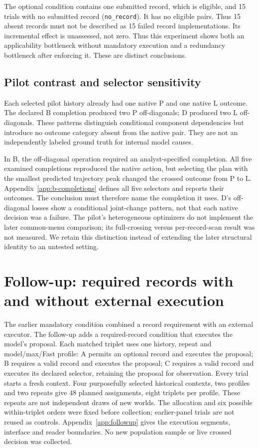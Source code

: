 The optional condition contains one submitted record, which is eligible,
and 15 trials with no submitted record (\texttt{no\_record}). It has no
eligible pairs. Thus 15 absent records must not be described as 15 failed
record implementations. Its incremental effect is unassessed, not zero. Thus this experiment
shows both an applicability bottleneck without mandatory execution and a
redundancy bottleneck after enforcing it. These are distinct conclusions.

\subsection{Pilot contrast and selector sensitivity}
\label{sec:selector-sensitivity}
Each selected pilot history already had one native P and one native L outcome.
The declared B completion produced two P off-diagonals; D produced two L
off-diagonals. These patterns distinguish conditional component dependencies
but introduce no outcome category absent from the native pair. They are not
an independently labeled ground truth for internal model causes.

In B, the off-diagonal operation required an analyst-specified completion.
All five examined completions reproduced the native action, but selecting
the plan with the smallest predicted trajectory peak changed the crossed
outcome from P to L. Appendix~\ref{app:b-completions} defines all five
selectors and reports their outcomes. The conclusion must therefore name
the completion it uses. D's off-diagonal losses show a conditional joint-change pattern, not
that each native decision was a failure. The pilot's heterogeneous optimizers
do not implement the later common-menu comparison; its full-crossing versus
per-record-scan result was not measured. We retain this distinction instead of
extending the later structural identity to an untested setting.


\section{Follow-up: required records with and without external execution}
\label{sec:followup}
The earlier mandatory condition combined a record requirement with an external
executor. The follow-up adds a required-record condition that executes the
model's proposal. Each matched triplet uses one history, repeat and
model/max/Fast profile: A permits an optional record and executes the proposal;
B requires a valid record and executes the proposal; C requires a valid record
and executes its declared selector, retaining the proposal for observation.
Every trial starts a fresh context. Four purposefully selected historical
contexts, two profiles and two repeats give 48 planned assignments, eight
triplets per profile. These repeats are not independent draws of new worlds.
The allocation and six possible within-triplet orders were fixed before
collection; earlier-panel trials are not reused as controls.
Appendix~\ref{app:followup} gives the execution segments, interface and reader
boundaries. No new population sample or live crossed decision was collected.

